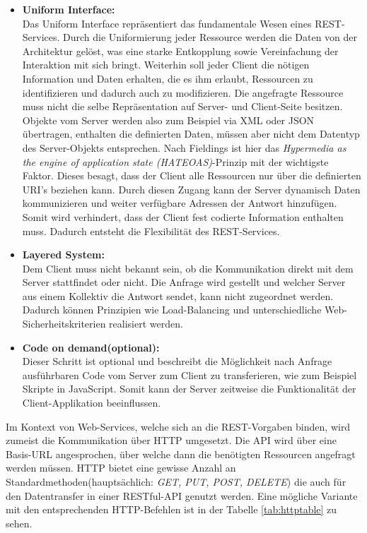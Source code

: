 \documentclass[fleqn,10pt,ngerman]{SelfArx}
\begin{document}
\begin{itemize}
	\item \textbf{Uniform Interface:}\\ Das Uniform Interface repräsentiert das fundamentale Wesen eines REST-Services. Durch die Uniformierung jeder Ressource werden die Daten von der Architektur gelöst, was eine starke Entkopplung sowie Vereinfachung der Interaktion mit sich bringt. Weiterhin soll jeder Client die nötigen Information und Daten erhalten, die es ihm erlaubt, Ressourcen zu identifizieren und dadurch auch zu modifizieren. Die angefragte Ressource muss nicht die selbe Repräsentation auf Server- und Client-Seite besitzen. Objekte vom Server werden also zum Beispiel via XML oder JSON übertragen, enthalten die definierten Daten, müssen aber nicht dem Datentyp des Server-Objekts entsprechen. Nach Fieldings ist hier das \textit{Hypermedia as the engine of application state (HATEOAS)}-Prinzip mit der wichtigste Faktor. Dieses besagt, dass der Client alle Ressourcen nur über die definierten URI's beziehen kann. Durch diesen Zugang kann der Server dynamisch Daten kommunizieren und weiter verfügbare Adressen der Antwort hinzufügen. Somit wird verhindert, dass der Client fest codierte Information enthalten muss. Dadurch entsteht die Flexibilität des REST-Services.
	\item \textbf{Layered System:}\\ Dem Client muss nicht bekannt sein, ob die Kommunikation direkt mit dem Server stattfindet oder nicht. Die Anfrage wird gestellt und welcher Server aus einem Kollektiv die Antwort sendet, kann nicht zugeordnet werden. Dadurch können Prinzipien wie Load-Balancing und unterschiedliche Web-Sicherheitskriterien realisiert werden. 
	\item \textbf{Code on demand(optional):}\\ Dieser Schritt ist optional und beschreibt die Möglichkeit nach Anfrage ausführbaren Code vom Server zum Client zu transferieren, wie zum Beispiel Skripte in JavaScript. Somit kann der Server zeitweise die Funktionalität der Client-Applikation beeinflussen.
\end{itemize} 
Im Kontext von Web-Services, welche sich an die REST-Vorgaben binden, wird zumeist die Kommunikation über HTTP umgesetzt. Die API wird über eine Basis-URL angesprochen, über welche dann die benötigten Ressourcen angefragt werden müssen. HTTP bietet eine gewisse Anzahl an Standardmethoden(hauptsächlich: \textit{GET, PUT, POST, DELETE}) die auch für den Datentransfer in einer RESTful-API genutzt werden. Eine mögliche Variante mit den entsprechenden HTTP-Befehlen ist in der Tabelle \ref{tab:httptable} zu sehen.
\end{document}

